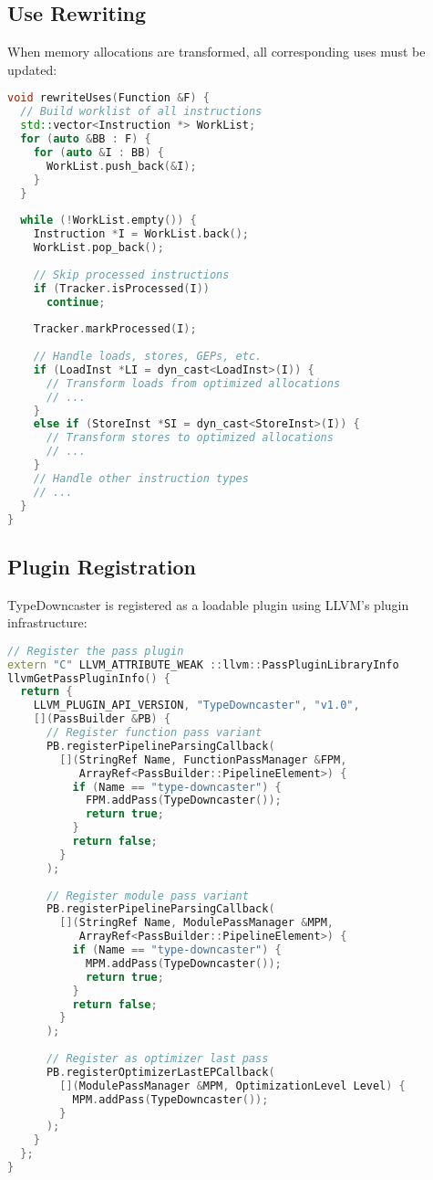 \documentclass[conference]{IEEEtran}
\begin{document}
\subsection{Use Rewriting}
When memory allocations are transformed, all corresponding uses must be updated:

\begin{lstlisting}[language=C++]
void rewriteUses(Function &F) {
  // Build worklist of all instructions
  std::vector<Instruction *> WorkList;
  for (auto &BB : F) {
    for (auto &I : BB) {
      WorkList.push_back(&I);
    }
  }
  
  while (!WorkList.empty()) {
    Instruction *I = WorkList.back();
    WorkList.pop_back();
    
    // Skip processed instructions
    if (Tracker.isProcessed(I))
      continue;
    
    Tracker.markProcessed(I);
    
    // Handle loads, stores, GEPs, etc.
    if (LoadInst *LI = dyn_cast<LoadInst>(I)) {
      // Transform loads from optimized allocations
      // ...
    }
    else if (StoreInst *SI = dyn_cast<StoreInst>(I)) {
      // Transform stores to optimized allocations
      // ...
    }
    // Handle other instruction types
    // ...
  }
}
\end{lstlisting}

\subsection{Plugin Registration}
TypeDowncaster is registered as a loadable plugin using LLVM's plugin infrastructure:

\begin{lstlisting}[language=C++]
// Register the pass plugin
extern "C" LLVM_ATTRIBUTE_WEAK ::llvm::PassPluginLibraryInfo
llvmGetPassPluginInfo() {
  return {
    LLVM_PLUGIN_API_VERSION, "TypeDowncaster", "v1.0",
    [](PassBuilder &PB) {
      // Register function pass variant
      PB.registerPipelineParsingCallback(
        [](StringRef Name, FunctionPassManager &FPM,
           ArrayRef<PassBuilder::PipelineElement>) {
          if (Name == "type-downcaster") {
            FPM.addPass(TypeDowncaster());
            return true;
          }
          return false;
        }
      );
      
      // Register module pass variant
      PB.registerPipelineParsingCallback(
        [](StringRef Name, ModulePassManager &MPM,
           ArrayRef<PassBuilder::PipelineElement>) {
          if (Name == "type-downcaster") {
            MPM.addPass(TypeDowncaster());
            return true;
          }
          return false;
        }
      );
      
      // Register as optimizer last pass
      PB.registerOptimizerLastEPCallback(
        [](ModulePassManager &MPM, OptimizationLevel Level) {
          MPM.addPass(TypeDowncaster());
        }
      );
    }
  };
}
\end{lstlisting}
\end{document}
